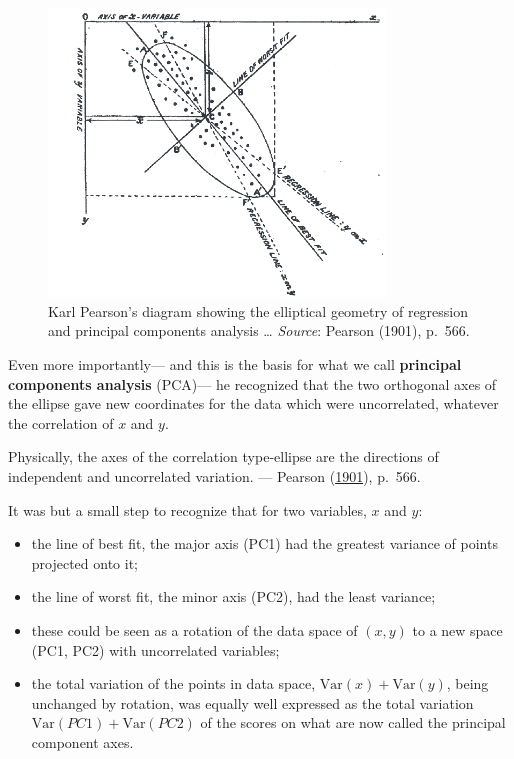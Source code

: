 \documentclass[
  letterpaper,
  10pt,
  krantz2]{krantz}
\providecommand{\tightlist}{%
  \setlength{\itemsep}{0pt}\setlength{\parskip}{0pt}}\usepackage{longtable,booktabs,array}
\renewenvironment{quote}{\begin{VF}}{\end{VF}}
\begin{document}
\begin{figure}

{\centering \includegraphics[width=0.8\textwidth,height=\textheight]{images/Pearson1901_2.png}

}

\caption{\label{fig-Pearson1901-2}Karl Pearson's diagram showing the
elliptical geometry of regression and principal components analysis
\ldots{} \emph{Source}: Pearson (1901), p.~566.}

\end{figure}

Even more importantly--- and this is the basis for what we call
\textbf{principal components analysis} (PCA)--- he recognized that the
two orthogonal axes of the ellipse gave new coordinates for the data
which were uncorrelated, whatever the correlation of \(x\) and \(y\).

\begin{quote}
Physically, the axes of the correlation type-ellipse are the directions
of independent and uncorrelated variation. --- Pearson
(\protect\hyperlink{ref-Pearson:1901}{1901}), p.~566.
\end{quote}

It was but a small step to recognize that for two variables, \(x\) and
\(y\):

\begin{itemize}
\tightlist
\item
  the line of best fit, the major axis (PC1) had the greatest variance
  of points projected onto it;
\item
  the line of worst fit, the minor axis (PC2), had the least variance;
\item
  these could be seen as a rotation of the data space of \((x, y)\) to a
  new space (PC1, PC2) with uncorrelated variables;
\item
  the total variation of the points in data space,
  \(\text{Var}(x) + \text{Var}(y)\), being unchanged by rotation, was
  equally well expressed as the total variation
  \(\text{Var}(PC1) + \text{Var}(PC2)\) of the scores on what are now
  called the principal component axes.
\end{itemize}
\end{document}
